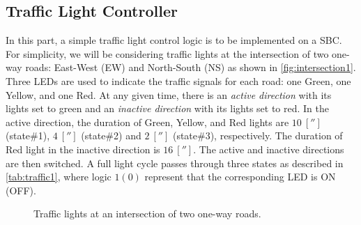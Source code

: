 \subsection{Traffic Light Controller}
\label{sec:voltageDivider}
In this part, a simple traffic light control logic is to be implemented on a SBC. For simplicity, we will be considering traffic lights at the intersection of two one-way roads: East-West (EW) and North-South (NS) as shown in \autoref{fig:intersection1}. Three LEDs are used to indicate the traffic signals for each road: one Green, one Yellow, and  one Red. At any given time, there is an \emph{active direction} with its lights set to green  and an \emph{inactive direction} with its lights set to red. In the active direction, the duration of Green, Yellow, and Red lights are $10~[\second]$ (state\#1), $4~[\second]$ (state\#2) and $2~[\second]$ (state\#3), respectively.  The duration of Red light in the inactive direction is $16~[\second].$ The active and inactive directions are then switched. A full light cycle passes through three states as described in \autoref{tab:traffic1}, where logic $1(0)$ represent that the corresponding LED  is ON (OFF). %
%
\begin{figure}
  \centering
  \caption{Traffic lights at an intersection of two one-way roads.}
  \label{fig:intersection1}
\end{figure}

